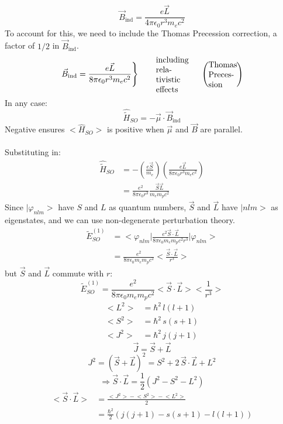 \documentclass[12pt,fancychapters]{report}
\numberwithin{equation}{section}
\begin{document}
\[
  \vec{B}_\text{ind} = \frac{e \vec{L}}{4\pi \epsilon_0 r^3 m_e c^2}
\]
To account for this, we need to include the Thomas Precession correction, a factor of $1/2$ in
$\vec{B}_\text{ind}$.
\[
  \left.
  \vec{B}_\text{ind} = \frac{e\vec{L}}{8\pi \epsilon_0 r^3 m_e c^2}
\right\}
\qquad \parbox{0.1\textwidth}{including relativistic effects}
\qquad \left(\parbox{0.1\textwidth}{Thomas Precession} \right)
\]
In any case: 
\[
  \hat{\tilde{H}}_{SO} = -\vec{\mu}\cdot \vec{B}_\text{ind}
\]
Negative ensures $\big<\hat{H}_{SO} \big>$ is positive when $\vec{\mu}$ and $\vec{B}$ are 
parallel.\\
\\
Substituting in: 
\begin{align*}
  \hat{\tilde{H}}_{SO} &= -\left(\frac{e\vec{S}}{m_e} \right)\left(\frac{e\vec{L}}
  {8\pi\epsilon_0 r^3 m_e c^2} \right)\\
                       &= \frac{e^2}{8\pi \epsilon_0 r^3}\frac{\vec{S}\vec{L}}{m_e m_p c^2}
\end{align*}
Since $\big|\varphi_{nlm} \big>$ have $S$ and $L$ as quantum numbers, $\vec{S}$ and $\vec{L}$
 have $\big|nlm \big>$ as eigenstates, and we can use non-degenerate perturbation theory.
 \begin{align*}
   \tilde{E}^{(1)}_{SO} &= \bigg<\varphi_{nlm}\bigg| \frac{e^2 \vec{S}\cdot\vec{L}}
   {8\pi \epsilon_0 m_e m_p c^2 r^3}\bigg|\varphi_{nlm}\bigg>\\
                        &= \frac{e^2}{8\pi\epsilon_0 m_e m_p c^2}
                        \bigg< \frac{\vec{S}\cdot\vec{L}}{r^3}\bigg>
 \end{align*}
 but $\vec{S}$ and $\vec{L}$ commute with $r$:
 \[
 \tilde{E}^{(1)}_{SO}=\frac{e^2}{8\pi\epsilon_0 m_e m_p c^2}
\bigg<\vec{S}\cdot\vec{L}\bigg>\bigg<\frac{1}{r^3}\bigg>
 \]
\begin{align*}
  \big<L^2\big>  &= \hbar^2\, l(l + 1)\\
  \big<S^2\big> &= \hbar^2\, s(s+1)\\
  \big< J^2\big> &= \hbar^2\,j(j+1)
\end{align*}
\[
  \vec{J} = \vec{S} + \vec{L}
\]
\[
  J^2 =\left(\vec{S} + \vec{L}\right)^2 = S^2 + 2\,\vec{S}\cdot \vec{L} + L^2 
\]
\[
  \Rightarrow \vec{S}\cdot\vec{L} = \frac{1}{2}\left(J^2 - S^2 - L^2\right)
\]
\begin{align*}
  \big<\vec{S}\cdot \vec{L} \big> &= \frac{\big<J^2\big> - \big<S^2\big> - \big<L^2\big>}
  {2}\\
  &= \frac{\hbar^2}{2}\left(j(j+1) - s(s+1)- l(l+1)\right)
\end{align*}
\end{document}
